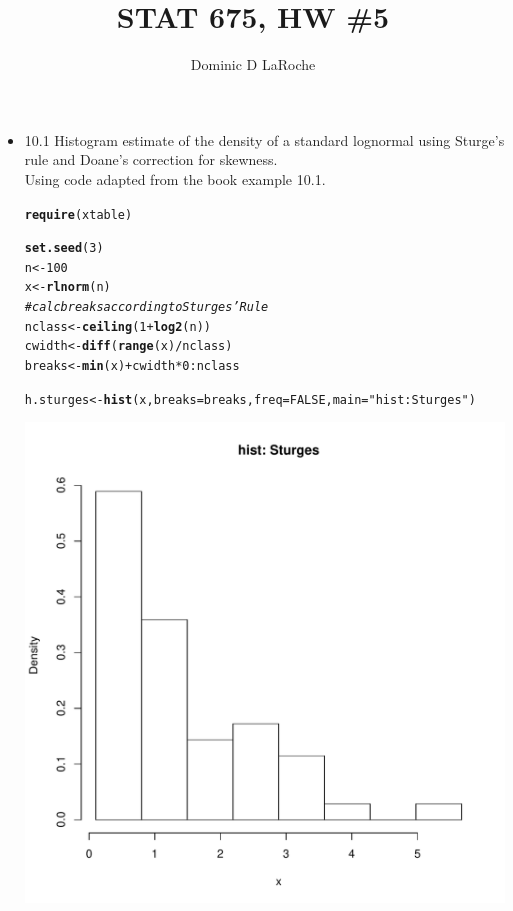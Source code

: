 \documentclass{article}\usepackage[]{graphicx}\usepackage[]{color}
\title{STAT 675, HW \#5}
\author{Dominic D LaRoche}
\makeatletter
\def\maxwidth{ %
  \ifdim\Gin@nat@width>\linewidth
    \linewidth
  \else
    \Gin@nat@width
  \fi
}
\newcommand{\hlstr}[1]{\textcolor[rgb]{0.192,0.494,0.8}{#1}}%
\newcommand{\hlcom}[1]{\textcolor[rgb]{0.678,0.584,0.686}{\textit{#1}}}%
\newcommand{\hlkwd}[1]{\textcolor[rgb]{0.737,0.353,0.396}{\textbf{#1}}}%
\newenvironment{kframe}{%
 \def\at@end@of@kframe{}%
 \ifinner\ifhmode%
  \def\at@end@of@kframe{\end{minipage}}%
  \begin{minipage}{\columnwidth}%
 \fi\fi%
 \def\FrameCommand##1{\hskip\@totalleftmargin \hskip-\fboxsep
 \colorbox{shadecolor}{##1}\hskip-\fboxsep
     \hskip-\linewidth \hskip-\@totalleftmargin \hskip\columnwidth}%
 \MakeFramed {\advance\hsize-\width
   \@totalleftmargin\z@ \linewidth\hsize
   \@setminipage}}%
 {\par\unskip\endMakeFramed%
 \at@end@of@kframe}
\makeatother
\begin{document}
\begin{itemize}
\item{10.1} Histogram estimate of the density of a standard lognormal using Sturge's rule and Doane's correction for skewness.\\

Using code adapted from the book example 10.1.\\

\begin{kframe}
\begin{alltt}
\hlkwd{require}(xtable)
\end{alltt}


{\ttfamily\noindent\itshape\color{messagecolor}{\#\# Loading required package: xtable}}\begin{alltt}
\hlkwd{set.seed}(3)
n <- 100
x <- \hlkwd{rlnorm}(n)
\hlcom{# calc breaks according to Sturges' Rule}
nclass <- \hlkwd{ceiling}(1 + \hlkwd{log2}(n))
cwidth <- \hlkwd{diff}(\hlkwd{range}(x)/nclass)
breaks <- \hlkwd{min}(x) + cwidth * 0:nclass

h.sturges <- \hlkwd{hist}(x, breaks = breaks, freq = FALSE, main = \hlstr{"hist: Sturges"})
\end{alltt}
\end{kframe}
\includegraphics[width=\maxwidth]{figure/ten11} 
\begin{kframe}\begin{alltt}


\end{alltt}
\end{kframe}
\end{itemize}
\end{document}
